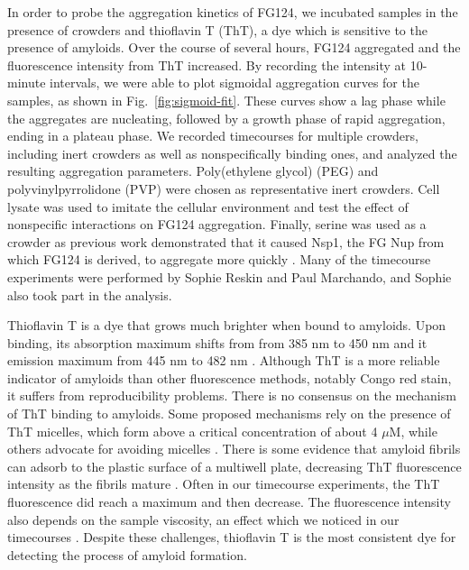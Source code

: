 In order to probe the aggregation kinetics of FG124, we incubated samples in the presence of crowders and thioflavin T (ThT), a dye which is sensitive to the presence of amyloids.  Over the course of several hours, FG124 aggregated and the fluorescence intensity from ThT increased.  By recording the intensity at 10-minute intervals, we were able to plot sigmoidal aggregation curves for the samples, as shown in Fig.~\ref{fig:sigmoid-fit}.  These curves show a lag phase while the aggregates are nucleating, followed by a growth phase of rapid aggregation, ending in a plateau phase.  We recorded timecourses for multiple crowders, including inert crowders as well as nonspecifically binding ones, and analyzed the resulting aggregation parameters.  Poly(ethylene glycol) (PEG) and polyvinylpyrrolidone (PVP) were chosen as representative inert crowders.  Cell lysate was used to imitate the cellular environment and test the effect of nonspecific interactions on FG124 aggregation.  Finally, serine was used as a crowder as previous work demonstrated that it caused Nsp1, the FG Nup from which FG124 is derived, to aggregate more quickly \cite{milles13}.  Many of the timecourse experiments were performed by Sophie Reskin and Paul Marchando, and Sophie also took part in the analysis.

Thioflavin T is a dye that grows much brighter when bound to amyloids.  Upon binding, its absorption maximum shifts from from 385 nm to 450 nm and it emission maximum from 445 nm to 482 nm \cite{picken12}.  Although ThT is a more reliable indicator of amyloids than other fluorescence methods, notably Congo red stain, it suffers from reproducibility problems.  There is no consensus on the mechanism of ThT binding to amyloids.  Some proposed mechanisms rely on the presence of ThT micelles, which form above a critical concentration of about 4 $\mu$M, while others advocate for avoiding micelles \cite{khurana05, groenning09}.  There is some evidence that amyloid fibrils can adsorb to the plastic surface of a multiwell plate, decreasing ThT fluorescence intensity as the fibrils mature \cite{murray13}.  Often in our timecourse experiments, the ThT fluorescence did reach a maximum and then decrease.  The fluorescence intensity also depends on the sample viscosity, an effect which we noticed in our timecourses \cite{sulatskaya10}.  Despite these challenges, thioflavin T is the most consistent dye for detecting the process of amyloid formation.

